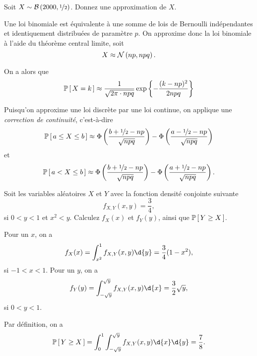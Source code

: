 \documentclass[11pt]{article}
\renewcommand\P[1]{%
	\ensuremath{%
		\mathbb{P}\left[\,#1\,\right]%
	}%
}%
\newcommand\Bin[2]{%
	\ensuremath{%
		\mathcal{B}\left(#1,#2\right)%
	}%
}%
\newcommand\Norm[2]{%
	\ensuremath{%
		\mathcal{N}\left(#1,#2\right)%
	}%
}%
\theoremstyle{remark}
\theoremstyle{definition}
\begin{document}
\begin{exemple}
	Soit $X\sim\Bin{2000}{\nicefrac{1}{2}}$. Donnez une approximation de $X$.

	Une loi binomiale est équivalente à une somme de lois de Bernoulli
	indépendantes et identiquement distribuées de paramètre $p$. On approxime
	donc la loi binomiale à l'aide du théorème central limite, soit
	\begin{equation*}
		X\approx\Norm{np}{npq}.
	\end{equation*}
	
	On a alors que
	\begin{equation*}
		\P{X=k}\approx\frac{1}{\sqrt{2\pi\cdot npq}}\exp\left\{
			-\frac{(k-np)^2}{2npq}
		\right\}
	\end{equation*}

	Puisqu'on approxime une loi discrète par une loi continue, on applique
	une \textit{correction de continuité}, c'est-à-dire
	\begin{equation*}
		\P{a\leq X\leq b}
		\approx\Phi\left(
			\frac{b+\nicefrac{1}{2}-np}{\sqrt{npq}}
		\right)-\Phi\left(
			\frac{a-\nicefrac{1}{2}-np}{\sqrt{npq}}
		\right)
	\end{equation*}
	et
	\begin{equation*}
		\P{a<X\leq b}
		\approx\Phi\left(
			\frac{b+\nicefrac{1}{2}-np}{\sqrt{npq}}
		\right)-\Phi\left(
			\frac{a+\nicefrac{1}{2}-np}{\sqrt{npq}}
		\right).
	\end{equation*}
\end{exemple}

\begin{exemple}
	Soit les variables aléatoires $X$ et $Y$ avec la fonction densité conjointe
	suivante
	\begin{equation*}
		f_{X,Y}(x,y)=\frac{3}{4},
	\end{equation*}
	si $0<y<1$ et $x^2<y$. Calculez $f_X(x)$ et $f_Y(y)$, ainsi que
	$\P{Y\geq X}$.

	Pour un $x$, on a
	\begin{equation*}
		f_X(x)
		=\int_{x^2}^1f_{X,Y}(x,y)\d{y}
		=\frac{3}{4}(1-x^2),
	\end{equation*}
	si $-1<x<1$. Pour un $y$, on a
	\begin{equation*}
		f_Y(y)
		=\int_{-\sqrt{y}}^{\sqrt{y}}f_{X,Y}(x,y)\d{x}
		=\frac{3}{2}\sqrt{y},
	\end{equation*}
	si $0<y<1$.

	Par définition, on a
	\begin{equation*}
		\P{Y\geq X}
		=\int_0^1\int_{-\sqrt{y}}^{\sqrt{y}}f_{X,Y}(x,y)\d{x}\d{y}
		=\frac{7}{8}.
	\end{equation*}
\end{exemple}
\end{document}
